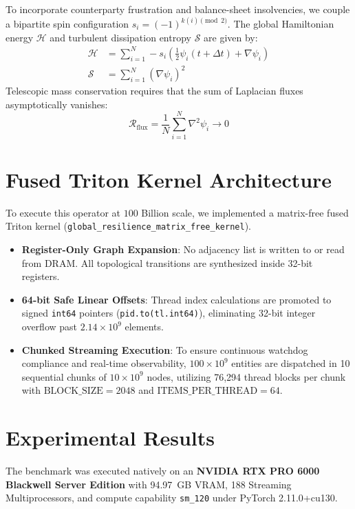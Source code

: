 \documentclass[10pt,twocolumn]{article}
\begin{document}
To incorporate counterparty frustration and balance-sheet insolvencies, we couple a bipartite spin configuration $s_i = (-1)^{k(i) \pmod 2}$. The global Hamiltonian energy $\mathcal{H}$ and turbulent dissipation entropy $\mathcal{S}$ are given by:
\begin{align}
\mathcal{H} &= \sum_{i=1}^N -s_i \left(\frac{1}{2}\psi_i(t+\Delta t) + \nabla \psi_i \right) \\
\mathcal{S} &= \sum_{i=1}^N (\nabla \psi_i)^2
\end{align}
Telescopic mass conservation requires that the sum of Laplacian fluxes asymptotically vanishes:
\begin{equation}
\mathcal{R}_{\text{flux}} = \frac{1}{N} \sum_{i=1}^N \nabla^2 \psi_i \to 0
\end{equation}

\section{Fused Triton Kernel Architecture}
To execute this operator at $100$ Billion scale, we implemented a matrix-free fused Triton kernel (\texttt{global\_resilience\_matrix\_free\_kernel}). 

\begin{itemize}
    \item \textbf{Register-Only Graph Expansion}: No adjacency list is written to or read from DRAM. All topological transitions are synthesized inside 32-bit registers.
    \item \textbf{64-bit Safe Linear Offsets}: Thread index calculations are promoted to signed \texttt{int64} pointers (\texttt{pid.to(tl.int64)}), eliminating 32-bit integer overflow past $2.14\times 10^9$ elements.
    \item \textbf{Chunked Streaming Execution}: To ensure continuous watchdog compliance and real-time observability, $100\times 10^9$ entities are dispatched in 10 sequential chunks of $10\times 10^9$ nodes, utilizing 76,294 thread blocks per chunk with $\text{BLOCK\_SIZE}=2048$ and $\text{ITEMS\_PER\_THREAD}=64$.
\end{itemize}

\section{Experimental Results}
The benchmark was executed natively on an \textbf{NVIDIA RTX PRO 6000 Blackwell Server Edition} with 94.97~GB VRAM, 188 Streaming Multiprocessors, and compute capability \texttt{sm\_120} under PyTorch 2.11.0+cu130.
\end{document}
